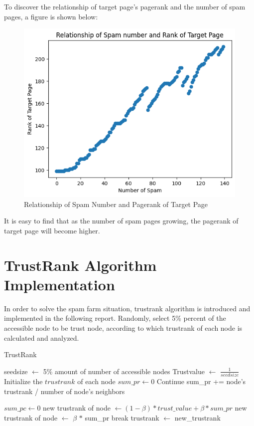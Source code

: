 \documentclass{article}
\begin{document}
	To discover the relationship of target page's pagerank and the number of spam pages, a figure is shown below:
	\begin{figure}[H]
		\centering
		\includegraphics[scale=0.5]{Relationship of Spam Number and Pagerank of Target Page.png}
		\caption{Relationship of Spam Number and Pagerank of Target Page}
	\end{figure}
	It is easy to find that as the number of spam pages growing, the pagerank of target page will become higher.
	
	\section*{TrustRank Algorithm Implementation}
	In order to solve the spam farm situation, trustrank algorithm is introduced and implemented in the following report. Randomly, select 5\% percent of the accessible node to be trust node, according to which trustrank of each node is calculated and analyzed.
	
	\begin{algorithm}
		\caption{TrustRank}\label{alg:trustrank}
		\begin{algorithmic}
			\State seedsize $\gets$ 5\% amount of number of accessible nodes
			\State Trustvalue $\gets$ $\frac{1}{seedsize}$
			\State Initialize the $trustrank$ of each node 
			\State $sum\_pr \gets 0$ 
			\State Continue
			\EndIf
			\State sum\_pr += node's trustrank / number of node's neighbors
			
			\EndFor
			\Else
			\State $sum\_pc \gets 0$
			\EndIf
				\State new trustrank of node $\gets (1-\beta) * trust\_value + \beta * sum\_pr$
			\Else
				\State new trustrank of node $\gets$ $\beta$ $*$ sum\_pr
			\EndIf
			\EndFor
			\State break
			\EndIf
			\State trustrank $\gets$ new\_trustrank
			\EndFor
		\end{algorithmic}
	\end{algorithm}
	
\end{document}
